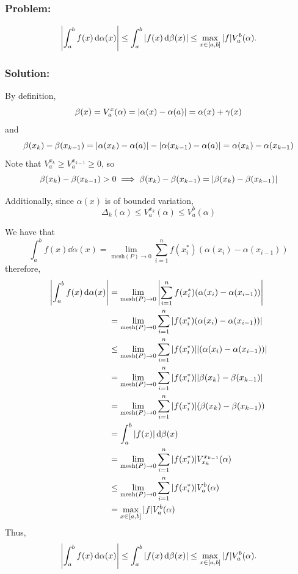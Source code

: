 \documentclass[]{article}
\begin{document}
\subsection{}
\subsubsection*{Problem:}
\[
    \abs{\int_{a}^{b} f(x) \dd{\alpha(x)}} 
    \leq \int_{a}^{b} \abs{f(x) \dd{\beta(x)}} 
    \leq \max_{x \in [a,b]} \abs{f} V_{a}^{b}(\alpha).
\]

\subsubsection*{Solution:}
By definition, \[
    \beta(x) = V_{a}^{x} (\alpha) = \abs{\alpha(x) - \alpha(a)} = \alpha(x) + \gamma(x)
\] and \[
    \beta(x_{k}) - \beta(x_{k-1}) = \abs{\alpha(x_k) - \alpha(a)} - \abs{\alpha(x_{k-1}) - \alpha(a)} = \alpha(x_k) - \alpha(x_{k-1})
\] 
Note that $V_{a}^{x_{k}} \geq V_{a}^{x_{k-1}} \geq 0$, so \[
    \beta(x_{k}) - \beta(x_{k-1}) > 0 \implies \beta(x_{k}) - \beta(x_{k-1}) = \abs{\beta(x_{k}) - \beta(x_{k-1})}
\]

Additionally, since $\alpha(x)$ is of bounded variation, \[
    \Delta_k(\alpha) \leq V_{a}^{x_k}(\alpha) \leq V_{a}^{b} (\alpha)
\] 

We have that \[
    \int_{a}^{b} f(x) \dd{\alpha(x)} 
    = \lim_{\text{mesh}(P)\to 0} \sum_{i=1}^{n} f(x_i^*) (\alpha(x_i) - \alpha(x_{i-1}))
\] therefore, \begin{align*}
    \abs{\int_{a}^{b} f(x) \dd{\alpha(x)}} 
        &= \lim_{\text{mesh}(P)\to 0} \abs{\sum_{i=1}^{n} f(x_i^*) (\alpha(x_i) - \alpha(x_{i-1}))}\\
        &= \lim_{\text{mesh}(P)\to 0} \sum_{i=1}^{n} \abs{f(x_i^*) (\alpha(x_i) - \alpha(x_{i-1}))}\\
        &\leq \lim_{\text{mesh}(P)\to 0} \sum_{i=1}^{n} \abs{f(x_i^*)} \abs{(\alpha(x_i) - \alpha(x_{i-1}))}\\
        &= \lim_{\text{mesh}(P)\to 0} \sum_{i=1}^{n} \abs{f(x_i^*)} \abs{\beta(x_{k}) - \beta(x_{k-1})}\\
        &= \lim_{\text{mesh}(P)\to 0} \sum_{i=1}^{n} \abs{f(x_i^*)} (\beta(x_{k}) - \beta(x_{k-1}))\\
        &= \int_{a}^{b} \abs{f(x)} \dd{\beta(x)}\\
        &= \lim_{\text{mesh}(P)\to 0} \sum_{i=1}^{n} \abs{f(x_i^*)} V_{x_{k}}^{x_{k-1}}(\alpha)\\
        &\leq \lim_{\text{mesh}(P)\to 0} \sum_{i=1}^{n} \abs{f(x_i^*)} V_{a}^{b}(\alpha)\\
        &= \max_{x \in [a,b]} \abs{f} V_{a}^{b}(\alpha)
\end{align*}
Thus,\[
    \abs{\int_{a}^{b} f(x) \dd{\alpha(x)}} 
    \leq \int_{a}^{b} \abs{f(x) \dd{\beta(x)}} 
    \leq \max_{x \in [a,b]} \abs{f} V_{a}^{b}(\alpha).
\]
\end{document}
